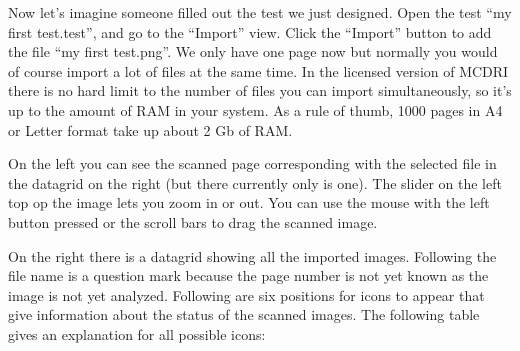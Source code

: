 \documentclass[10pt,a4paper]{article}
\newcommand{\name}{MCDRI }
\begin{document}
Now let's imagine someone filled out the test we just designed. Open the test ``my first test.test'', and go to the ``Import'' view. Click the ``Import'' button to add the file ``my first test.png''. We only have one page now but normally you would of course import a lot of files at the same time. In the licensed version of \name there is no hard limit to the number of files you can import simultaneously, so it's up to the amount of RAM in your system. As a rule of thumb, 1000 pages in A4 or Letter format take up about 2 Gb of RAM.

On the left you can see the scanned page corresponding with the selected file in the datagrid on the right (but there currently only is one). The slider on the left top op the image lets you zoom in or out. You can use the mouse with the left button pressed or the scroll bars to drag the scanned image. 

On the right there is a datagrid showing all the imported images. Following the file name is a question mark because the page number is not yet known as the image is not yet analyzed. Following are six positions for icons to appear that give information about the status of the scanned images. The following table gives an explanation for all possible icons:\\
\end{document}
